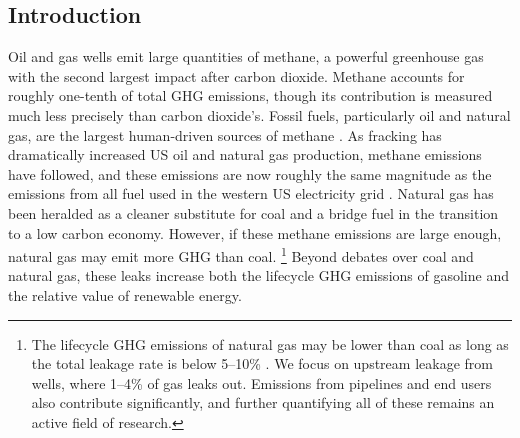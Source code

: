\documentclass[12pt,oneside,letterpaper]{article}
\theoremstyle{definition}
\begin{document}
\begin{refsection}

\newpage


\newpage

\section{Introduction}
\label{sec:introduction}


Oil and gas wells emit large quantities of methane, a powerful greenhouse gas with the second largest impact after carbon dioxide.
Methane accounts for roughly one-tenth of total \gls{GHG} emissions, though its contribution is measured much less precisely than carbon dioxide's.
Fossil fuels, particularly oil and natural gas, are the largest human-driven sources of methane \parencite{epa-ghgi:2020, Alvarez/etal:2018}.
As fracking has dramatically increased US oil and natural gas production, methane emissions have followed, and these emissions are now roughly the same magnitude as the emissions from all fuel used in the western US electricity grid \parencite{epa-egrid-2018}.
Natural gas has been heralded as a cleaner substitute for coal and a bridge fuel in the transition to a low carbon economy.
However, if these methane emissions are large enough, natural gas may emit more \gls{GHG} than coal.%
\footnote{%
The lifecycle \gls{GHG} emissions of natural gas may be lower than coal as long as the total leakage rate is below 5--10\% \parencite{Hausfather:2015}.
We focus on upstream leakage from wells, where 1--4\% of gas leaks out.
Emissions from pipelines and end users also contribute significantly, and further quantifying all of these remains an active field of research.
}
Beyond debates over coal and natural gas, these leaks increase both the lifecycle \gls{GHG} emissions of gasoline and the relative value of renewable energy.



\end{refsection}
\end{document}
